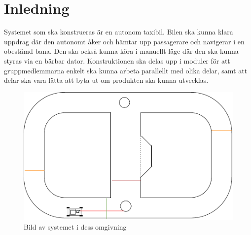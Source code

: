 \documentclass[systemskiss/skiss.tex]{subfiles}
\begin{document}
\section{Inledning}
Systemet som ska konstrueras är en autonom taxibil. Bilen ska kunna klara uppdrag där den autonomt åker och hämtar upp passagerare och navigerar i en obestämd bana. Den ska också kunna köra i manuellt läge där den ska kunna styras via en bärbar dator. Konstruktionen ska delas upp i moduler för att gruppmedlemmarna enkelt ska kunna arbeta parallellt med olika delar, samt att delar ska vara lätta att byta ut om produkten ska kunna utvecklas.

\begin{figure}[h]
    \centering
    \includegraphics[width=0.6\linewidth]{systemskiss/figures/systemomgivning.pdf}
    \caption{Bild av systemet i dess omgivning}
    \label{fig:omgivning}
\end{figure}
\end{document}

